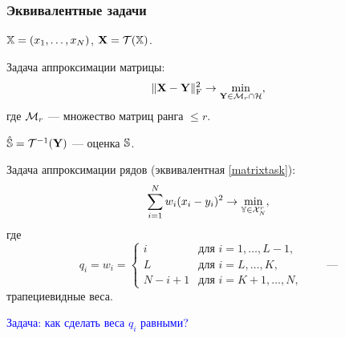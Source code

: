 \documentclass[unicode, notheorems]{beamer}
\begin{document}
\begin{frame}
	\frametitle{Эквивалентные задачи}
	\vspace{-0.2cm}
	$\mathbb{X} = (x_1, \ldots, x_N)$, $\mathbf{X} = \mathcal{T}(\mathbb{X})$. 
	
	Задача аппроксимации матрицы:
	\begin{equation} \label{matrixtask}
	\|\mathbf{X} - \mathbf{Y}\|^2_{\mathrm{F}} \to \min_{\substack{\mathbf{Y} \in \mathcal{M}_r \cap \mathcal{H}}},
	\end{equation}
	где $\mathcal{M}_r$ --- множество матриц ранга $\le r$.
	
	$\hat {\mathbb{S}} = \mathcal{T}^{-1}(\mathbf{Y})$ --- оценка $\mathbb{S}$.
	
	Задача аппроксимации рядов (эквивалентная \eqref{matrixtask}):
	\begin{equation*}
	\sum \limits_{i=1}^N w_i(x_i - y_i)^2 \to \min_{\mathbb{Y} \in \mathcal{X}_N^r},
	\end{equation*}
	где	\begin{equation*}
	q_i = w_i = \begin{cases}
	i & \text{для $i = 1, \ldots, L-1,$}\\
	L & \text{для $i = L, \ldots, K,$}\\
	N - i + 1 & \text{для $i = K + 1, \ldots, N,$}
	\end{cases} \qquad \text{---}
	\end{equation*}
	трапециевидные веса.
	
	\textcolor{blue}{Задача: как сделать веса $q_i$ равными?}
\end{frame}

\end{document}
